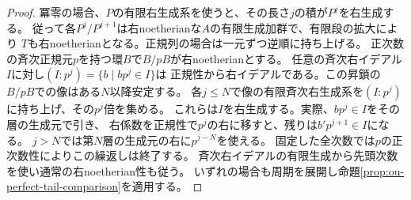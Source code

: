 \documentclass[11pt,a4paper]{ltjsarticle}
\theoremstyle{definition}
\begin{document}
\begin{proof}
冪零の場合、$P$の有限右生成系を使うと、その長さ$j$の積が$P^j$を右生成する。
従って各$P^j/P^{j+1}$は右noetherianな$A$の有限生成加群で、有限段の拡大により
$T$も右noetherianとなる。正規列の場合は一元ずつ逆順に持ち上げる。
正次数の斉次正規元$p$を持つ環$B$で$B/pB$が右noetherianとする。
任意の斉次右イデアル$I$に対し$(I:p^j)=\{b\mid b p^j\in I\}$は
正規性から右イデアルである。この昇鎖の$B/pB$での像はある$N$以降安定する。
各$j\le N$で像の有限斉次右生成系を$(I:p^j)$に持ち上げ、その$p^j$倍を集める。
これらは$I$を右生成する。実際、$b p^j\in I$をその層の生成元で引き、
右係数を正規性で$p^j$の右に移すと、残りは$b' p^{j+1}\in I$になる。
$j>N$では第$N$層の生成元の右に$p^{j-N}$を使える。
固定した全次数では$p$の正次数性によりこの繰返しは終了する。
斉次右イデアルの有限生成から先頭次数を使い通常の右noetherian性も従う。
いずれの場合も周期を展開し命題\ref{prop:ou-perfect-tail-comparison}を適用する。
\end{proof}
\end{document}
